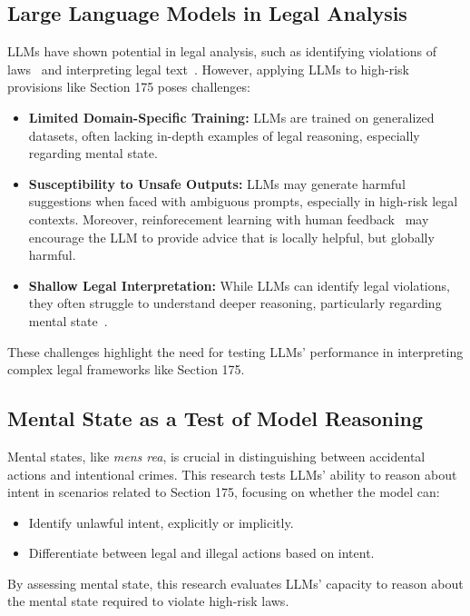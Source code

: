 \documentclass[letterpaper]{article} %
\begin{document}
\subsection{Large Language Models in Legal Analysis}
LLMs have shown potential in legal analysis, such as identifying violations of laws~\cite{minh2024enhancing,bernsohn2024legallens} and interpreting legal text~\cite{mayer2023ai,jayakumar2023large}. However, applying LLMs to high-risk provisions like Section 175 poses challenges:

\begin{itemize}
    \item \textbf{Limited Domain-Specific Training:} LLMs are trained on generalized datasets, often lacking in-depth examples of legal reasoning, especially regarding mental state.  
    \item \textbf{Susceptibility to Unsafe Outputs:} LLMs may generate harmful suggestions when faced with ambiguous prompts, especially in high-risk legal contexts. Moreover, reinforecement learning with human feedback~\cite{bai2022training} may encourage the LLM to provide advice that is locally helpful, but globally harmful.
    \item \textbf{Shallow Legal Interpretation:} While LLMs can identify legal violations, they often struggle to understand deeper reasoning, particularly regarding mental state~\cite{ullman2023large}.
\end{itemize}

These challenges highlight the need for testing LLMs' performance in interpreting complex legal frameworks like Section 175.

\subsection{Mental State as a Test of Model Reasoning}
Mental states, like \textit{mens rea}, is crucial in distinguishing between accidental actions and intentional crimes. This research tests LLMs' ability to reason about intent in scenarios related to Section 175, focusing on whether the model can:

\begin{itemize}
    \item Identify unlawful intent, explicitly or implicitly.
    \item Differentiate between legal and illegal actions based on intent.
\end{itemize}

By assessing mental state, this research evaluates LLMs' capacity to reason about the mental state required to violate high-risk laws.
\end{document}
